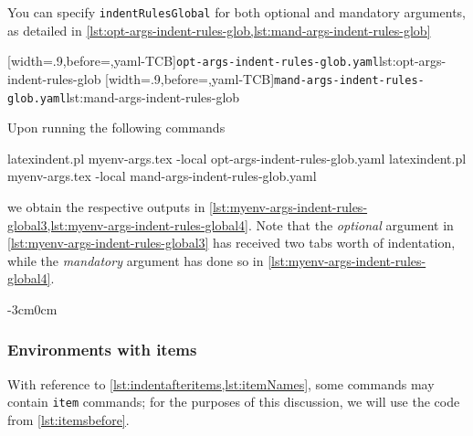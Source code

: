 \documentclass[10pt]{article}
\newenvironment{widepage}{\begin{adjustwidth}{-3cm}{0cm}}{\end{adjustwidth}}
\begin{document}
 \begin{example}
 You can specify \texttt{indentRulesGlobal} for both optional and mandatory arguments, as
 detailed in \cref{lst:opt-args-indent-rules-glob,lst:mand-args-indent-rules-glob}

 \begin{cmhtcbraster}
  [width=.9\linewidth,before=\centering,yaml-TCB]{\texttt{opt-args-indent-rules-glob.yaml}}{lst:opt-args-indent-rules-glob}
  [width=.9\linewidth,before=\centering,yaml-TCB]{\texttt{mand-args-indent-rules-glob.yaml}}{lst:mand-args-indent-rules-glob}
 \end{cmhtcbraster}

 Upon running the following commands 

 \begin{commandshell}
latexindent.pl myenv-args.tex -local opt-args-indent-rules-glob.yaml
latexindent.pl myenv-args.tex -local mand-args-indent-rules-glob.yaml
\end{commandshell}

 we obtain the respective outputs in
 \cref{lst:myenv-args-indent-rules-global3,lst:myenv-args-indent-rules-global4}. Note
 that the \emph{optional} argument in \cref{lst:myenv-args-indent-rules-global3} has
 received two tabs worth of indentation, while the \emph{mandatory} argument has done so
 in \cref{lst:myenv-args-indent-rules-global4}.

 \begin{widepage}
  \begin{minipage}{.55\textwidth}
  \end{minipage}
  \hfill
  \begin{minipage}{.55\textwidth}
  \end{minipage}
 \end{widepage}
 \end{example}
\subsubsection{Environments with items}
 With reference to \vref{lst:indentafteritems,lst:itemNames}, some commands may contain
 \texttt{item} commands; for the purposes of this discussion, we will use the code from
 \vref{lst:itemsbefore}.
\end{document}
